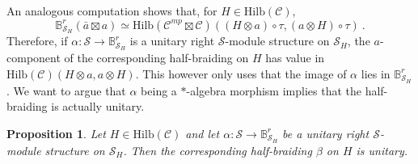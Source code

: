 \documentclass[a4paper,11pt,reqno]{amsart}
\numberwithin{equation}{section}
\newtheorem{proposition}[theorem]{Proposition}
\theoremstyle{remark}
\theoremstyle{definition}
\newcommand{\bB}{\mathbb B}
\newcommand{\cC}{\mathcal C}
\newcommand{\cS}{\mathcal S}
\newcommand{\Hilb}{\mathrm{Hilb}}
\begin{document}
An analogous computation shows that, for $H \in \Hilb(\cC)$,
\[
\bB^r_{\cS_H}(\bar{a} \boxtimes a) \simeq \Hilb(\cC^{mp} \boxtimes \cC) ((H \otimes a) \circ \tau, (a \otimes H) \circ \tau) \ .
\] 
Therefore, if $\alpha: \cS \to \bB^r_{\cS_H}$ is a unitary right $\cS$-module structure on $
\cS_H$, the $a$-component of the corresponding half-braiding on $H$ has value in $\Hilb(\cC) (H \otimes a, a \otimes H)$. This however only uses that the image of $\alpha$ lies in $\bB^r_{\cS_H}$. We want to argue that $\alpha$ being a $*$-algebra morphism implies that the half-braiding is actually unitary.

\begin{proposition}
	Let $H \in \Hilb(\cC)$ and let $\alpha: \cS \to \bB^r_{\cS_H}$ be a unitary right $\cS$-module structure on $\cS_H$. Then the corresponding half-braiding $\beta$ on $H$ is unitary.
	\label{prop:fromunitaryrightSmodulestounitaryhalfbraidings}
\end{proposition}
\end{document}
